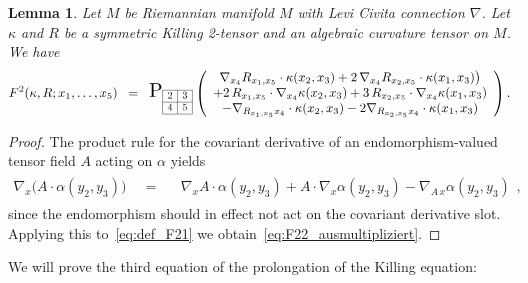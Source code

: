 \documentclass[11pt,a4paper]{article}
\theoremstyle{plain}
\newtheorem{lemma}{Lemma}
\theoremstyle{remark}
\newcommand{\rmP}{\mathrm{P}}
\begin{document}
\bigskip
\begin{lemma}\label{le:ausmultiplizieren}
Let $M$ be Riemannian manifold $M$ with Levi Civita connection $\nabla$. Let
$\kappa$ and $R$ be a symmetric Killing 2-tensor and an algebraic curvature tensor on $M$. 
We have
\begin{equation}\label{eq:F22_ausmultipliziert}
F^2(\kappa,R;x_1,\ldots,x_5) \;\;=\;\;  \scaleto{\rmP_{\scaleto{\begin{array}{|c|c|}
\cline{1-2}
2 & 3 \\
\cline{1-2}
4  & 5 \\
\cline{1-2} 
\end{array}}{12pt}}}{24pt}\left (
\begin{array}{c}
   \nabla_{x_4} R_{x_1,x_5}\cdot\kappa(x_2,x_3) + 2\, \nabla_{x_4}R_{x_2,x_5}\cdot \kappa(x_1,x_3)\big )\\
 + 2\, R_{x_1,x_5}\cdot\nabla_{x_4}\kappa(x_2,x_3) + 3\, R_{x_2,x_5}\cdot\nabla_{x_4}\kappa(x_1,x_3)\\
-  \nabla_{R_{x_1,x_5} x_4}\cdot\kappa(x_2,x_3) - 2 \nabla_{R_{x_2,x_5}x_4}\cdot\kappa(x_1,x_3)
\end{array}\right ).
\end{equation}
\end{lemma}
\begin{proof}
The product rule for the covariant 
derivative of an endomorphism-valued tensor field $A$ acting on $\alpha$ yields
\begin{eqnarray}
\nabla_x \big (A\cdot \alpha(y_2,y_3) \big ) &\;\;=\;\;& \begin{array}{c}\nabla_x A \cdot \alpha(y_2,y_3)
+ A\cdot  \nabla_x \alpha(y_2,y_3) -  \nabla_{A\,x} \alpha(y_2,y_3)\end{array},
\end{eqnarray}
since the endomorphism should in effect not act on the covariant derivative slot. Applying this to~\eqref{eq:def_F21} we obtain~\eqref{eq:F22_ausmultipliziert}.
\end{proof}

We will prove the third equation of the prolongation of the Killing equation:
\end{document}
